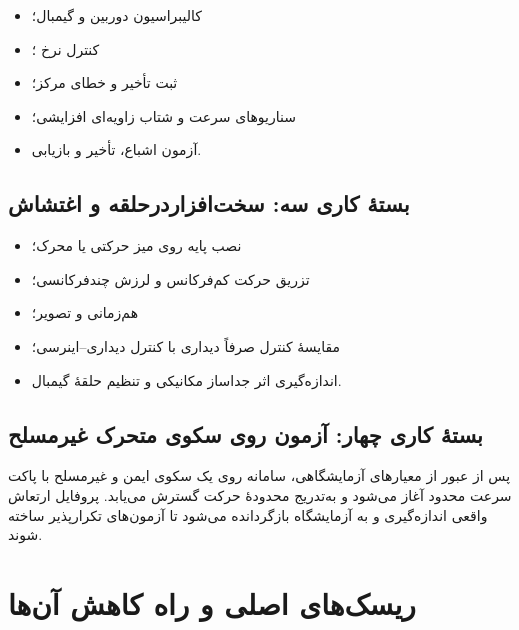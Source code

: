 \documentclass[12pt,a4paper]{article}
\newcommand{\EN}[1]{\lr{#1}}
\begin{document}
\begin{itemize}
    \item کالیبراسیون دوربین و گیمبال؛
    \item کنترل نرخ \EN{pan/tilt}؛
    \item ثبت تأخیر و خطای مرکز؛
    \item سناریوهای سرعت و شتاب زاویه‌ای افزایشی؛
    \item آزمون اشباع، تأخیر و بازیابی.
\end{itemize}

\subsection{بستهٔ کاری سه: سخت‌افزاردرحلقه و اغتشاش}

\begin{itemize}
    \item نصب پایه روی میز حرکتی یا محرک؛
    \item تزریق حرکت کم‌فرکانس و لرزش چندفرکانسی؛
    \item هم‌زمانی \EN{IMU} و تصویر؛
    \item مقایسهٔ کنترل صرفاً دیداری با کنترل دیداری--اینرسی؛
    \item اندازه‌گیری اثر جداساز مکانیکی و تنظیم حلقهٔ گیمبال.
\end{itemize}

\subsection{بستهٔ کاری چهار: آزمون روی سکوی متحرک غیرمسلح}

پس از عبور از معیارهای آزمایشگاهی، سامانه روی یک سکوی ایمن و غیرمسلح با پاکت سرعت محدود آغاز می‌شود و به‌تدریج محدودهٔ حرکت گسترش می‌یابد. پروفایل ارتعاش واقعی اندازه‌گیری و به آزمایشگاه بازگردانده می‌شود تا آزمون‌های تکرارپذیر ساخته شوند.

\section{ریسک‌های اصلی و راه کاهش آن‌ها}
\end{document}
